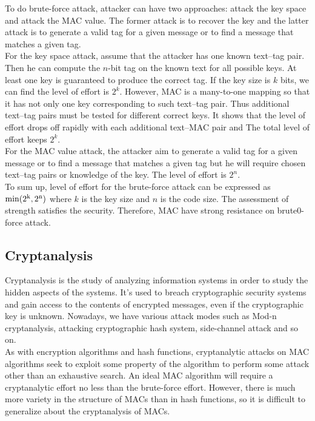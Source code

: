\documentclass[12pt,a4paper,oneside]{report}
\begin{document}
To do brute-force attack, attacker can have two approaches: attack the key space and
attack the MAC value. The former attack is to recover the key and the latter attack is to generate a valid tag for a given message or to find a message that matches a given tag.\\

For the key space attack, assume that the attacker has one known text–tag pair. Then he can compute the $n$-bit tag on the known text for all possible keys. At least one key is guaranteed to produce the correct tag. If the key size is $k$ bits, we can find the level of effort is $2^k$. However, MAC is a many-to-one mapping so that it has not only one key corresponding to such text–tag pair. Thus additional text–tag pairs must be tested for different correct keys. It shows that the level of effort drops off rapidly with each additional text–MAC pair and The total level of effort keeps $2^k$.\\

For the MAC value attack, the attacker aim to generate a valid tag for a given message or to find a message that matches a given tag but he will require chosen text–tag pairs or knowledge of the key. The level of effort is $2^n$.\\

To sum up, level of effort for the brute-force attack can be expressed as $\rm{min}(2^k,2^n)$ where $k$ is the key size and $n$ is the code size. The assessment of strength satisfies the security. Therefore, MAC have strong resistance on brute0-force attack.\\

\subsection{Cryptanalysis}
Cryptanalysis is the study of analyzing information systems in order to study the hidden aspects of the systems. It's used to breach cryptographic security systems and gain access to the contents of encrypted messages, even if the cryptographic key is unknown. Nowadays, we have various attack modes such as Mod-n cryptanalysis, attacking cryptographic hash system, side-channel attack and so on\cite{11}.\\

As with encryption algorithms and hash functions, cryptanalytic attacks on MAC algorithms seek to exploit some property of the algorithm to perform some attack other than an exhaustive search. An ideal MAC algorithm will require a cryptanalytic effort no less than the brute-force effort. However, there is much more variety in the structure of MACs than in hash functions, so it is difficult to generalize about the cryptanalysis of MACs.\\
\end{document}
